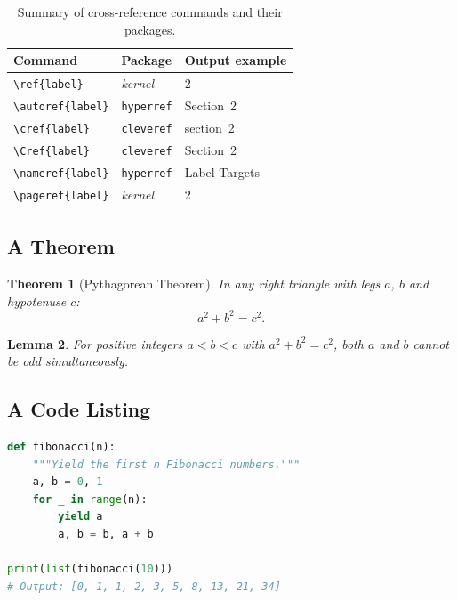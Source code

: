\documentclass[12pt,a4paper]{article}
\newtheorem{theorem}{Theorem}[section]
\newtheorem{lemma}[theorem]{Lemma}
\begin{document}
\begin{table}[h]
\centering
\caption{Summary of cross-reference commands and their packages.}
\label{tab:data}
\begin{tabular}{lll}
\toprule
\textbf{Command} & \textbf{Package} & \textbf{Output example} \\
\midrule
\verb|\ref{label}|        & \textit{kernel}      & 2 \\
\verb|\autoref{label}|    & \texttt{hyperref}    & Section~2 \\
\verb|\cref{label}|       & \texttt{cleveref}    & section~2 \\
\verb|\Cref{label}|       & \texttt{cleveref}    & Section~2 \\
\verb|\nameref{label}|    & \texttt{hyperref}    & Label Targets \\
\verb|\pageref{label}|    & \textit{kernel}      & 2 \\
\bottomrule
\end{tabular}
\end{table}

\subsection{A Theorem}
\label{subsec:thm}

\begin{theorem}[Pythagorean Theorem]
\label{thm:pythagoras}
In any right triangle with legs $a$, $b$ and hypotenuse $c$:
\[
    a^2 + b^2 = c^2.
\]
\end{theorem}

\begin{lemma}
\label{lem:square_sum}
For positive integers $a < b < c$ with $a^2 + b^2 = c^2$, both $a$ and $b$
cannot be odd simultaneously.
\end{lemma}

\subsection{A Code Listing}
\label{subsec:lst}

\begin{lstlisting}[language=Python, caption={Iterative Fibonacci sequence generator.}, label=lst:fibonacci]
def fibonacci(n):
    """Yield the first n Fibonacci numbers."""
    a, b = 0, 1
    for _ in range(n):
        yield a
        a, b = b, a + b

print(list(fibonacci(10)))
# Output: [0, 1, 1, 2, 3, 5, 8, 13, 21, 34]
\end{lstlisting}
\end{document}
